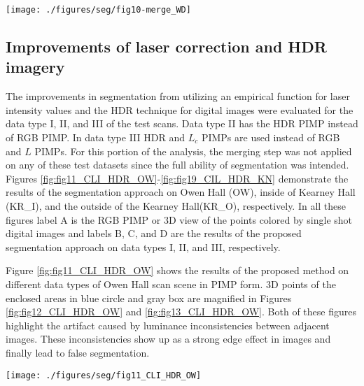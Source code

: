 \documentclass[final,3p,times,twocolumn,authoryear]{elsarticle}
\begin{document}
\begin{figure*}[ht]
	\centering
	\texttt{[image: ./figures/seg/fig10-merge\_WD]}
	\caption{A) HDR PIMP of WD scan data with a small section highlighted in 3D, B) segmentation results with merging threshold = 0.1 C) segmentation results with merging threshold = 0.5 D) segmentation results with merging threshold = 0.8.  Note that the subset image shown in 3D spans the starting (0 deg) and end point (360 deg) of the scan.}
	\label{fig:fig10-merge_WD}
\end{figure*}

\subsection{Improvements of laser correction and HDR imagery}
The improvements in segmentation from utilizing an empirical function for laser intensity values and the HDR technique for digital images were evaluated for the data type I, II, and III of the test scans. Data type II has the HDR PIMP instead of RGB PIMP. In data type III HDR and $L_c$ PIMPs are used instead of RGB and $L$ PIMPs. For this portion of the analysis, the merging step was not applied on any of these test datasets since the full ability of segmentation was intended. 
Figures \ref{fig:fig11_CLI_HDR_OW}-\ref{fig:fig19_CIL_HDR_KN} demonstrate the results of the segmentation approach on Owen Hall (OW), inside of Kearney Hall (KR\_I), and the outside of the Kearney Hall(KR\_O), respectively. In all these figures label A is the RGB PIMP or 3D view of the points colored by single shot digital images and labels B, C, and D are the results of the proposed segmentation approach on data types I, II, and III, respectively.

Figure \ref{fig:fig11_CLI_HDR_OW} shows the results of the proposed method on different data types of Owen Hall scan scene in PIMP form. 3D points of the enclosed areas in blue circle and gray box are magnified in Figures \ref{fig:fig12_CLI_HDR_OW} and \ref{fig:fig13_CLI_HDR_OW}. Both of these figures highlight the artifact caused by luminance inconsistencies between adjacent images. These inconsistencies show up as a strong edge effect in images and finally lead to false segmentation. 

\begin{figure*}[p]
	\centering
	\texttt{[image: ./figures/seg/fig11\_CLI\_HDR\_OW]}
	\caption{Improvements in segmentation from applying laser intensity and HDR technique corrections on the OW scan scene A) RGB PIMP B) segmentation results on data type I, C) segmentation results on data type II, D) segmentation results on data type III.  }
	\label{fig:fig11_CLI_HDR_OW}
\end{figure*}
\end{document}
